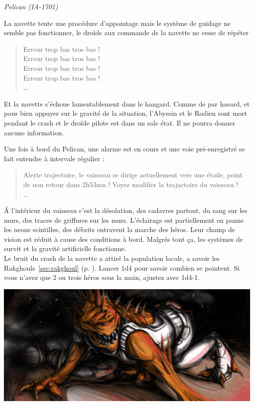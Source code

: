 \documentclass{jdrp}
\begin{document}
\begin{flushright}
	\emph{Pelican (IA-1701)}
\end{flushright}

\vspace{5\baselineskip}
La navette tente une procédure d'appomtage mais le système de guidage ne semble pas fonctionner, le droïde aux commande de la navette ne cesse de répéter 

\begin{quote}
	Erreur trop bas tros bas !\\
	Erreur trop bas tros bas !\\
	Erreur trop bas tros bas !\\
	Erreur trop bas tros bas !\\
	\ldots
\end{quote}

Et la navette s'échoue lamentablement dans le hangard. Comme de par hasard, et pour bien appuyer sur le gravité de la situation, l'Abyssin et le Rodien sont mort pendant le crash et le droïde pilote est dans un sale état. Il ne pourra donner aucune information.

Une fois à bord du Pelican, une alarme est en cours et une voie pré-enregistré se fait entendre à intervale régulier :

\begin{quote}
	Alerte trajectoire, le vaisseau se dirige actuellement vers une étoile, point de non retour dans 2h53mn ! 
	Voyez modifier la trajactoire du vaisseau !\\ 
	\ldots
\end{quote}

\'A l'intérieur du vaisseau c'est la désolation, des cadavres partout, du sang sur les murs, des traces de griffures sur les murs. L'éclairage est partiellement en panne les neons scintilles, des débrits entravent la marche des héros. Leur champ de vision est réduit à cause des conditions à bord. Malgrés tout ça, les systèmes de survit et la gravité artificielle fonctionne.\\

Le bruit du crash de la navette a attiré la population locale, a savoir les Rakghouls~\ref{sec:rakghoul} (p. \pageref{sec:rakghoul}). Lancer 1d4 pour savoir combien se pointent. Si vous n'avez que 2 ou trois héros sous la main, ajustez avec 1d4-1.

\noindent\includegraphics[width=\linewidth]{img/scenario/rakghoul.png}
\end{document}

